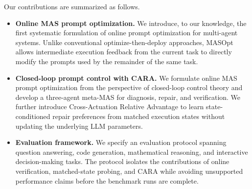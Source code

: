 Our contributions are summarized as follows.
\begin{itemize}
    \item \textbf{Online MAS prompt optimization.}
    We introduce, to our knowledge, the first systematic formulation of online prompt optimization for multi-agent systems.
    Unlike conventional optimize-then-deploy approaches, MASOpt allows intermediate execution feedback from the current task to directly modify the prompts used by the remainder of the same task.

    \item \textbf{Closed-loop prompt control with CARA.}
    We formulate online MAS prompt optimization from the perspective of closed-loop control theory and develop a three-agent meta-MAS for diagnosis, repair, and verification.
    We further introduce Cross-Actuation Relative Advantage to learn state-conditioned repair preferences from matched execution states without updating the underlying LLM parameters.

    \item \textbf{Evaluation framework.}
    We specify an evaluation protocol spanning question answering, code generation, mathematical reasoning, and interactive decision-making tasks.
    The protocol isolates the contributions of online verification, matched-state probing, and CARA while avoiding unsupported performance claims before the benchmark runs are complete.
\end{itemize}
